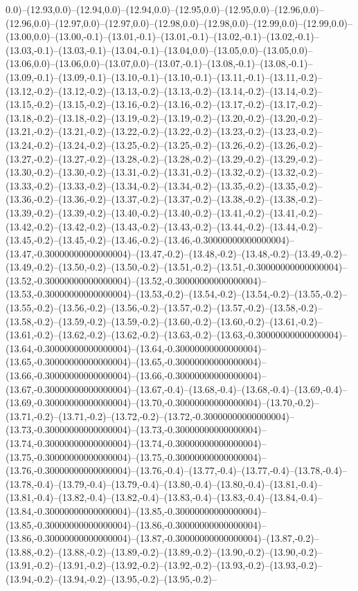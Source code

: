 0.0)--(12.93,0.0)--(12.94,0.0)--(12.94,0.0)--(12.95,0.0)--(12.95,0.0)--(12.96,0.0)--(12.96,0.0)--(12.97,0.0)--(12.97,0.0)--(12.98,0.0)--(12.98,0.0)--(12.99,0.0)--(12.99,0.0)--(13.00,0.0)--(13.00,-0.1)--(13.01,-0.1)--(13.01,-0.1)--(13.02,-0.1)--(13.02,-0.1)--(13.03,-0.1)--(13.03,-0.1)--(13.04,-0.1)--(13.04,0.0)--(13.05,0.0)--(13.05,0.0)--(13.06,0.0)--(13.06,0.0)--(13.07,0.0)--(13.07,-0.1)--(13.08,-0.1)--(13.08,-0.1)--(13.09,-0.1)--(13.09,-0.1)--(13.10,-0.1)--(13.10,-0.1)--(13.11,-0.1)--(13.11,-0.2)--(13.12,-0.2)--(13.12,-0.2)--(13.13,-0.2)--(13.13,-0.2)--(13.14,-0.2)--(13.14,-0.2)--(13.15,-0.2)--(13.15,-0.2)--(13.16,-0.2)--(13.16,-0.2)--(13.17,-0.2)--(13.17,-0.2)--(13.18,-0.2)--(13.18,-0.2)--(13.19,-0.2)--(13.19,-0.2)--(13.20,-0.2)--(13.20,-0.2)--(13.21,-0.2)--(13.21,-0.2)--(13.22,-0.2)--(13.22,-0.2)--(13.23,-0.2)--(13.23,-0.2)--(13.24,-0.2)--(13.24,-0.2)--(13.25,-0.2)--(13.25,-0.2)--(13.26,-0.2)--(13.26,-0.2)--(13.27,-0.2)--(13.27,-0.2)--(13.28,-0.2)--(13.28,-0.2)--(13.29,-0.2)--(13.29,-0.2)--(13.30,-0.2)--(13.30,-0.2)--(13.31,-0.2)--(13.31,-0.2)--(13.32,-0.2)--(13.32,-0.2)--(13.33,-0.2)--(13.33,-0.2)--(13.34,-0.2)--(13.34,-0.2)--(13.35,-0.2)--(13.35,-0.2)--(13.36,-0.2)--(13.36,-0.2)--(13.37,-0.2)--(13.37,-0.2)--(13.38,-0.2)--(13.38,-0.2)--(13.39,-0.2)--(13.39,-0.2)--(13.40,-0.2)--(13.40,-0.2)--(13.41,-0.2)--(13.41,-0.2)--(13.42,-0.2)--(13.42,-0.2)--(13.43,-0.2)--(13.43,-0.2)--(13.44,-0.2)--(13.44,-0.2)--(13.45,-0.2)--(13.45,-0.2)--(13.46,-0.2)--(13.46,-0.30000000000000004)--(13.47,-0.30000000000000004)--(13.47,-0.2)--(13.48,-0.2)--(13.48,-0.2)--(13.49,-0.2)--(13.49,-0.2)--(13.50,-0.2)--(13.50,-0.2)--(13.51,-0.2)--(13.51,-0.30000000000000004)--(13.52,-0.30000000000000004)--(13.52,-0.30000000000000004)--(13.53,-0.30000000000000004)--(13.53,-0.2)--(13.54,-0.2)--(13.54,-0.2)--(13.55,-0.2)--(13.55,-0.2)--(13.56,-0.2)--(13.56,-0.2)--(13.57,-0.2)--(13.57,-0.2)--(13.58,-0.2)--(13.58,-0.2)--(13.59,-0.2)--(13.59,-0.2)--(13.60,-0.2)--(13.60,-0.2)--(13.61,-0.2)--(13.61,-0.2)--(13.62,-0.2)--(13.62,-0.2)--(13.63,-0.2)--(13.63,-0.30000000000000004)--(13.64,-0.30000000000000004)--(13.64,-0.30000000000000004)--(13.65,-0.30000000000000004)--(13.65,-0.30000000000000004)--(13.66,-0.30000000000000004)--(13.66,-0.30000000000000004)--(13.67,-0.30000000000000004)--(13.67,-0.4)--(13.68,-0.4)--(13.68,-0.4)--(13.69,-0.4)--(13.69,-0.30000000000000004)--(13.70,-0.30000000000000004)--(13.70,-0.2)--(13.71,-0.2)--(13.71,-0.2)--(13.72,-0.2)--(13.72,-0.30000000000000004)--(13.73,-0.30000000000000004)--(13.73,-0.30000000000000004)--(13.74,-0.30000000000000004)--(13.74,-0.30000000000000004)--(13.75,-0.30000000000000004)--(13.75,-0.30000000000000004)--(13.76,-0.30000000000000004)--(13.76,-0.4)--(13.77,-0.4)--(13.77,-0.4)--(13.78,-0.4)--(13.78,-0.4)--(13.79,-0.4)--(13.79,-0.4)--(13.80,-0.4)--(13.80,-0.4)--(13.81,-0.4)--(13.81,-0.4)--(13.82,-0.4)--(13.82,-0.4)--(13.83,-0.4)--(13.83,-0.4)--(13.84,-0.4)--(13.84,-0.30000000000000004)--(13.85,-0.30000000000000004)--(13.85,-0.30000000000000004)--(13.86,-0.30000000000000004)--(13.86,-0.30000000000000004)--(13.87,-0.30000000000000004)--(13.87,-0.2)--(13.88,-0.2)--(13.88,-0.2)--(13.89,-0.2)--(13.89,-0.2)--(13.90,-0.2)--(13.90,-0.2)--(13.91,-0.2)--(13.91,-0.2)--(13.92,-0.2)--(13.92,-0.2)--(13.93,-0.2)--(13.93,-0.2)--(13.94,-0.2)--(13.94,-0.2)--(13.95,-0.2)--(13.95,-0.2)--